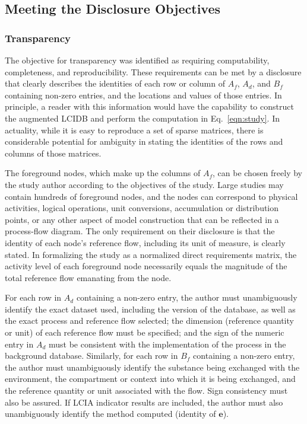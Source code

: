 


\subsection{Meeting the Disclosure Objectives}

\subsubsection{Transparency}

The objective for transparency was identified as requiring computability, completeness, and reproducibility.  These requirements can be met by a disclosure that clearly describes the identities of each row or column of $A_f$, $A_d$, and $B_f$ containing non-zero entries, and the locations and values of those entries.  In principle, a reader with this information would have the capability to construct the augmented LCIDB and perform the computation in Eq.~\ref{eqn:study}.  In actuality, while it is easy to reproduce a set of sparse matrices, there is considerable potential for ambiguity in stating the identities of the rows and columns of those matrices.

The foreground nodes, which make up the columns of $A_f$, can be chosen freely by the study author according to the objectives of the study.  Large studies may contain hundreds of foreground nodes, and the nodes can correspond to physical activities, logical operations, unit conversions, accumulation or distribution points, or any other aspect of model construction that can be reflected in a process-flow diagram.  The only requirement on their disclosure is that the identity of each node's reference flow, including its unit of measure, is clearly stated.  In formalizing the study as a normalized direct requirements matrix, the activity level of each foreground node necessarily equals the magnitude of the total reference flow emanating from the node.

For each row in $A_d$ containing a non-zero entry, the author must unambiguously identify the exact dataset used, including the version of the database, as well as the exact process and reference flow selected; the dimension (reference quantity or unit) of each reference flow must be specified; and the sign of the numeric entry in $A_d$ must be consistent with the implementation of the process in the background database.  Similarly, for each row in $B_f$ containing a non-zero entry, the author must unambiguously identify the substance being exchanged with the environment, the compartment or context into which it is being exchanged, and the reference quantity or unit associated with the flow.  Sign consistency must also be assured.  If LCIA indicator results are included, the author must also unambiguously identify the method computed (identity of $\mathbf{e}$).

